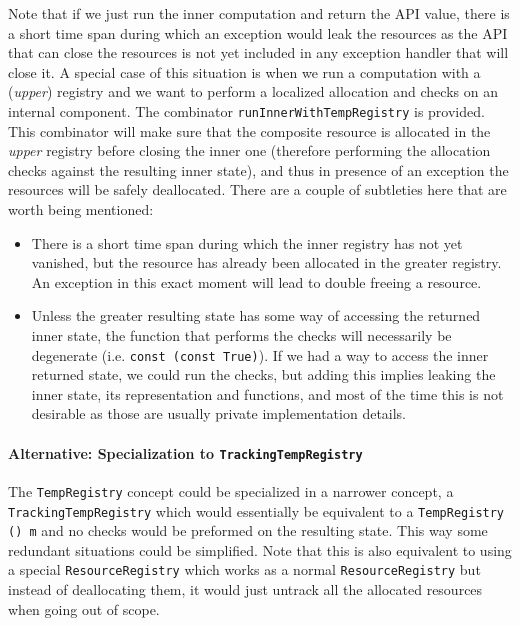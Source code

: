 Note that if we just run the inner computation and return the API value, there
is a short time span during which an exception would leak the resources as the
API that can close the resources is not yet included in any exception handler
that will close it. A special case of this situation is when we run a
computation with a (\emph{upper}) registry and we want to perform a localized
allocation and checks on an internal component. The combinator
\lstinline!runInnerWithTempRegistry! is provided. This combinator will make sure
that the composite resource is allocated in the \emph{upper} registry before
closing the inner one (therefore performing the allocation checks against the
resulting inner state), and thus in presence of an exception the resources will
be safely deallocated. There are a couple of subtleties here that are worth
being mentioned:

\begin{itemize}
  \item There is a short time span during which the inner registry has not yet
        vanished, but the resource has already been allocated in the greater
        registry. An exception in this exact moment will lead to double freeing
        a resource.
  \item Unless the greater resulting state has some way of accessing the
        returned inner state, the function that performs the checks will
        necessarily be degenerate (i.e. \lstinline!const (const True)!). If we
        had a way to access the inner returned state, we could run the checks,
        but adding this implies leaking the inner state, its representation and
        functions, and most of the time this is not desirable as those are
        usually private implementation details.
\end{itemize}

\paragraph{Alternative: Specialization to \lstinline!TrackingTempRegistry!} The
\lstinline!TempRegistry! concept could be specialized in a narrower concept, a
\lstinline!TrackingTempRegistry! which would essentially be equivalent to a
\lstinline!TempRegistry () m! and no checks would be preformed on the resulting
state. This way some redundant situations could be simplified. Note that this is
also equivalent to using a special \lstinline!ResourceRegistry! which works as a
normal \lstinline!ResourceRegistry! but instead of deallocating them, it would
just untrack all the allocated resources when going out of scope.
